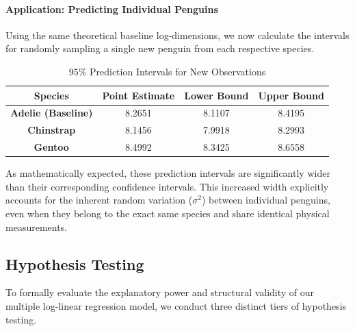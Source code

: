 \documentclass[12pt]{article}
\begin{document}
  \paragraph{Application: Predicting Individual Penguins}
  Using the same theoretical baseline log-dimensions, we now
  calculate the intervals for randomly sampling a single new
  penguin from each respective species.

  \begin{table}[H]
    \centering
    \begin{tabular}{|| c | c | c c ||}
      \hline
      \textbf{Species}
      & \textbf{Point Estimate}
      & \textbf{Lower Bound}
      & \textbf{Upper Bound} \\
      \hline\hline
      \textbf{Adelie (Baseline)} & 8.2651 & 8.1107 & 8.4195 \\
      \textbf{Chinstrap} & 8.1456 & 7.9918 & 8.2993 \\
      \textbf{Gentoo} & 8.4992 & 8.3425 & 8.6558 \\
      \hline
    \end{tabular}
    \caption{$95\%$ Prediction Intervals for New Observations}
  \end{table}

  As mathematically expected, these prediction intervals are
  significantly wider than their corresponding confidence
  intervals. This increased width explicitly accounts for the
  inherent random variation ($\sigma^2$) between individual
  penguins, even when they belong to the exact same species
  and share identical physical measurements.


  \subsection{Hypothesis Testing}
  To formally evaluate the explanatory power and structural
  validity of our multiple log-linear regression model, we
  conduct three distinct tiers of hypothesis testing.
\end{document}
